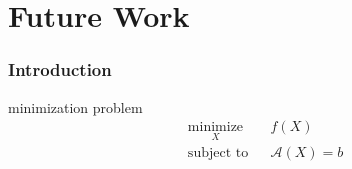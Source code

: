 \documentclass[11pt,xcolor=dvipsnames]{beamer}
\begin{document}
\section{Future Work}

\begin{frame}
\frametitle{Introduction}
\begin{block}{minimization problem}
	\begin{equation}
	\begin{aligned}
	& \underset{X}{\text{minimize}}
	& & f(X) \\
	& \text{subject to}
	& &  \mathcal{A}(X) = b
	\end{aligned}
	\end{equation}
\end{block}

\end{frame}

\end{document}
